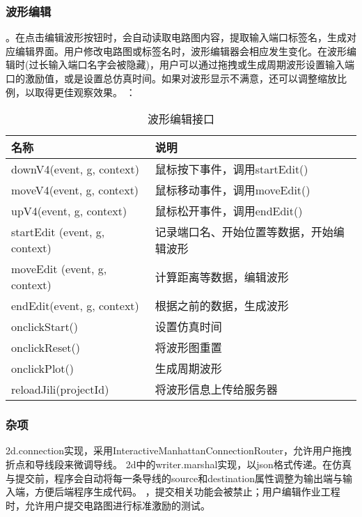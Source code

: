 \documentclass{article}
\begin{document}
\begin{CJK}{UTF8}{gbsn}
\subsubsection{波形编辑}
    。在点击编辑波形按钮时，会自动读取电路图内容，提取输入端口标签名，生成对应编辑界面。用户修改电路图或标签名时，波形编辑器会相应发生变化。在波形编辑时(过长输入端口名字会被隐藏)，用户可以通过拖拽或生成周期波形设置输入端口的激励值，或是设置总仿真时间。如果对波形显示不满意，还可以调整缩放比例，以取得更佳观察效果。
    ：
    \begin{table}[!h]
    \begin{tabular}{|l|l|}
    \hline
    名称 & 说明 \\
    \hline
    downV4(event, g, context) & 鼠标按下事件，调用startEdit() \\
    \hline
    moveV4(event, g, context) & 鼠标移动事件，调用moveEdit() \\
    \hline
    upV4(event, g, context) & 鼠标松开事件，调用endEdit() \\
    \hline
    startEdit (event, g, context) & 记录端口名、开始位置等数据，开始编辑波形 \\
    \hline
    moveEdit (event, g, context) & 计算距离等数据，编辑波形 \\
    \hline
    endEdit(event, g, context) & 根据之前的数据，生成波形 \\
    \hline
    onclickStart() & 设置仿真时间 \\
    \hline
    onclickReset() & 将波形图重置 \\
    \hline
    onclickPlot() & 生成周期波形 \\
    \hline
    reloadJili(projectId) & 将波形信息上传给服务器 \\
    \hline
    \end{tabular}
    \caption{波形编辑接口}
    \end{table}

\subsubsection{杂项}
    2d.connection实现，采用InteractiveManhattanConnectionRouter，允许用户拖拽折点和导线段来微调导线。
    2d中的writer.marshal实现，以json格式传递。在仿真与提交前，程序会自动将每一条导线的source和destination属性调整为输出端与输入端，方便后端程序生成代码。
    ，提交相关功能会被禁止；用户编辑作业工程时，允许用户提交电路图进行标准激励的测试。



\end{CJK}
\end{document}
